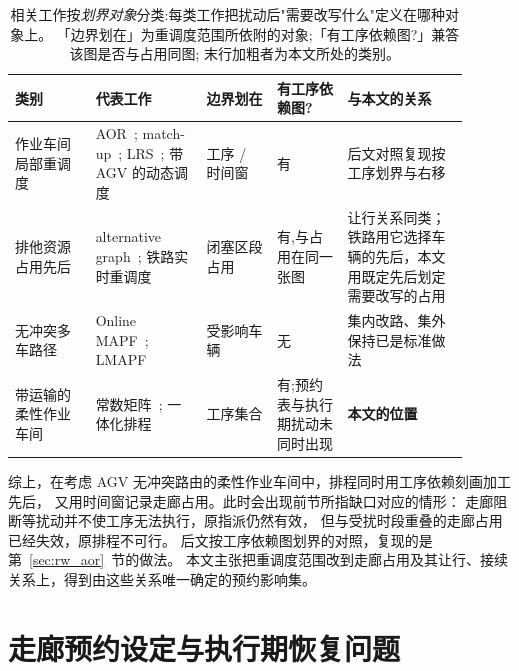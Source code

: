 \documentclass[manuscript,screen,review]{acmart}
\begin{document}
\begin{table}[t]
\centering
\caption{相关工作按\emph{划界对象}分类:每类工作把扰动后"需要改写什么"定义在哪种对象上。
「边界划在」为重调度范围所依附的对象;「有工序依赖图?」兼答该图是否与占用同图;
末行加粗者为本文所处的类别。}
\label{tab:position}
\small
\begin{tabular}{@{}p{0.16\linewidth}p{0.22\linewidth}p{0.14\linewidth}p{0.14\linewidth}p{0.24\linewidth}@{}}
\toprule
\textbf{类别} & \textbf{代表工作} & \textbf{边界划在} & \textbf{有工序依赖图?} & \textbf{与本文的关系} \\
\midrule
作业车间局部重调度 &
AOR~\cite{abumaizar1997rescheduling,subramaniam2003maor};
match-up~\cite{akturk1999matchup};
LRS~\cite{kuster2007local};
带 AGV 的动态调度~\cite{zhang2023energy,tang2026dynamic} &
工序 / 时间窗 & 有 &
后文对照复现按工序划界与右移 \\
\addlinespace[2pt]
排他资源占用先后 &
alternative graph~\cite{mascis2002alternative};
铁路实时重调度~\cite{dariano2007branch} &
闭塞区段占用 & 有,与占用在同一张图 &
让行关系同类；铁路用它选择车辆的先后，本文用既定先后划定需要改写的占用 \\
\addlinespace[2pt]
无冲突多车路径 &
Online MAPF~\cite{svancara2019online,malka2024online};
LMAPF~\cite{zhang2024guidance} &
受影响车辆 & 无 &
集内改路、集外保持已是标准做法 \\
\addlinespace[2pt]
带运输的柔性作业车间 &
常数矩阵~\cite{xin2025review,meng2025cp,qin2026knowledge,fu2025integrated};
一体化排程~\cite{vanos2026exact,sun2023integrated,li2026framework} &
工序集合 & 有;预约表与执行期扰动未同时出现 &
\textbf{本文的位置} \\
\bottomrule
\end{tabular}
\end{table}

综上，在考虑 AGV 无冲突路由的柔性作业车间中，排程同时用工序依赖刻画加工先后，
又用时间窗记录走廊占用。此时会出现前节所指缺口对应的情形：
走廊阻断等扰动并不使工序无法执行，原指派仍然有效，
但与受扰时段重叠的走廊占用已经失效，原排程不可行。
后文按工序依赖图划界的对照，复现的是第~\ref{sec:rw_aor}~节的做法。
本文主张把重调度范围改到走廊占用及其让行、接续关系上，得到由这些关系唯一确定的预约影响集。

\section{走廊预约设定与执行期恢复问题}
\label{sec:problem}
\end{document}
